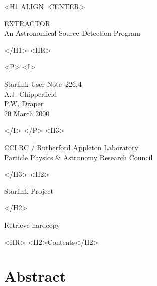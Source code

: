 \documentclass[twoside,11pt]{article}
\newcommand{\stardoccategory}  {Starlink User Note}
\newcommand{\stardocsource}    {sun\stardocnumber}
\newcommand{\stardocnumber}    {226.4}
\newcommand{\stardocauthors}   {A.J. Chipperfield\\
                                P.W. Draper}
\newcommand{\stardocdate}      {20 March 2000}
\newcommand{\stardoctitle}     {EXTRACTOR\\
                                An Astronomical Source Detection Program}
\newcommand{\htmladdnormallink}[2]{#1}
\newcommand{\htmladdimg}[1]{}
\newcommand{\htmlref}[2]{#1}
\newcommand{\htmladdtonavigation}[1]{}
\newcommand{\xlabel}[1]{}
\renewcommand{\_}{\texttt{\symbol{95}}}
\begin{document}
\begin{htmlonly}
   \xlabel{}
   \begin{rawhtml} <H1 ALIGN=CENTER> \end{rawhtml}
      \stardoctitle
   \begin{rawhtml} </H1> <HR> \end{rawhtml}

   \begin{center}
     \htmladdimg{sun226fig.gif}
   \end{center}

   \begin{rawhtml} <P> <I> \end{rawhtml}
   \stardoccategory\ \stardocnumber \\
   \stardocauthors \\
   \stardocdate
   \begin{rawhtml} </I> </P> <H3> \end{rawhtml}
      \htmladdnormallink{CCLRC / Rutherford Appleton Laboratory}
                        {http://www.cclrc.ac.uk}\\
      \htmladdnormallink{Particle Physics \& Astronomy Research Council}
                        {http://www.pparc.ac.uk} \\
   \begin{rawhtml} </H3> <H2> \end{rawhtml}
      \htmladdnormallink{Starlink Project}{http://www.starlink.rl.ac.uk/}
   \begin{rawhtml} </H2> \end{rawhtml}
   \htmladdnormallink{\htmladdimg{source.gif} Retrieve hardcopy}
      {http://www.starlink.rl.ac.uk/cgi-bin/hcserver?\stardocsource}\\

  \label{stardoccontents}
  \begin{rawhtml}
    <HR>
    <H2>Contents</H2>
  \end{rawhtml}
  \htmladdtonavigation{\htmlref{\htmladdimg{contents_motif.gif}}
        {stardoccontents}}

  \section{\xlabel{abstract}Abstract}
\end{htmlonly}
\end{document}
